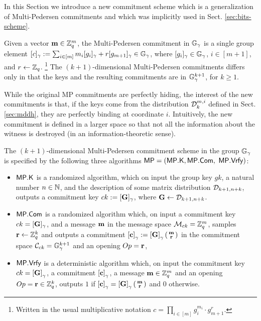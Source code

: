 In this Section we introduce a new commitment scheme which is a generalization of Multi-Pedersen commitments and which was implicitly used in Sect. \ref{sec:bits-scheme}. 

Given a vector $\mathbf{m}\in\mathbb{Z}_q^m$, the Multi-Pedersen commitment in $\mathbb{G}_{\gamma}$ is a single group element $[c]_\gamma:=\sum_{i\in [m]} m_i[g_i]_\gamma+r[g_{m+1}]_\gamma \in\mathbb{G}_\gamma$, where $[g_i]_{\gamma}\in\mathbb{G}_\gamma$, $i\in[m+1]$, and $r\gets\mathbb{Z}_q$. \footnote{Written in the usual multiplicative notation $c=\prod_{i\in[m]}g_i^{m_i} \cdot g_{m+1}^r$.}  The $(k+1)$-dimensional Multi-Pedersen commitments 
differs only in that the keys and the resulting commitments are in 
$\mathbb{G}_{\gamma}^{k+1}$, for $k\geq 1$. 


While the original MP commitments are perfectly hiding, the interest of the new commitments is that, if the keys come from the distribution $\mathcal{D}_k^{m,i}$ defined in Sect. \ref{sec:mddh}, they are perfectly binding at coordinate $i$. Intuitively, the new commitment is defined in a larger space so that not all the information about the witness is destroyed (in an information-theoretic sense). 

\begin{definition} The $(k+1)$-dimensional Multi-Pedersen commitment scheme in the group $\mathbb{G}_\gamma$ 
is specified by the following three algorithms 
	$\mathsf{MP}=(\mathsf{MP}.\mathsf{K},\mathsf{MP}.\mathsf{Com},$ $ \mathsf{MP}.\mathsf{Vrfy})$:
	\begin{itemize} 
		\item  $\mathsf{MP}.\mathsf{K}$ is a randomized algorithm, which on input the group key $gk$, a natural number $n \in \mathbb{N}$, and the description of some matrix distribution $\mathcal{D}_{k+1,n+k}$, 
		outputs a commitment key $ck:=[\mathbf{{G}}]_\gamma$, where $\mathbf{{G}} \gets \mathcal{D}_{k+1,n+k}$.
		\item $\mathsf{MP}.\mathsf{Com}$ is a randomized algorithm which, on input a commitment key $ck=[\mathbf{{G}}]_\gamma$, and a message 
		$\mathbf{m}$ in the message space $\mathcal{M}_{ck}=\mathbb{Z}_q^{m}$, samples $\mathbf{r} \gets \mathbb{Z}_q^k$ and outputs a commitment $\left[\mathbf{c}\right]_\gamma:=\left[\mathbf{{G}}\right]_\gamma\left(\begin{smallmatrix}\mathbf{m} \\ \mathbf{r}\end{smallmatrix}\right)$ in the commitment space $\mathcal{C}_{ck}=\mathbb{G}_\gamma^{k+1}$ and an opening $Op=\mathbf{r}$, 
		\item $\mathsf{MP}.\mathsf{Vrfy}$ is a deterministic algorithm which, on input the commitment key $ck=\left[\mathbf{{G}}\right]_\gamma$, a commitment $\left[\mathbf{c}\right]_\gamma$,  a message 
		$\mathbf{m} \in \mathbb{Z}_q^{m}$ and an opening $Op=\mathbf{r}\in\mathbb{Z}_q^k$, outputs $1$ if $\left[\mathbf{c}\right]_\gamma=\left[\mathbf{{G}}\right]_\gamma\left(\begin{smallmatrix}\mathbf{m} \\ \mathbf{r}\end{smallmatrix}\right)$
		and $0$ otherwise. 
	\end{itemize}
\end{definition}

